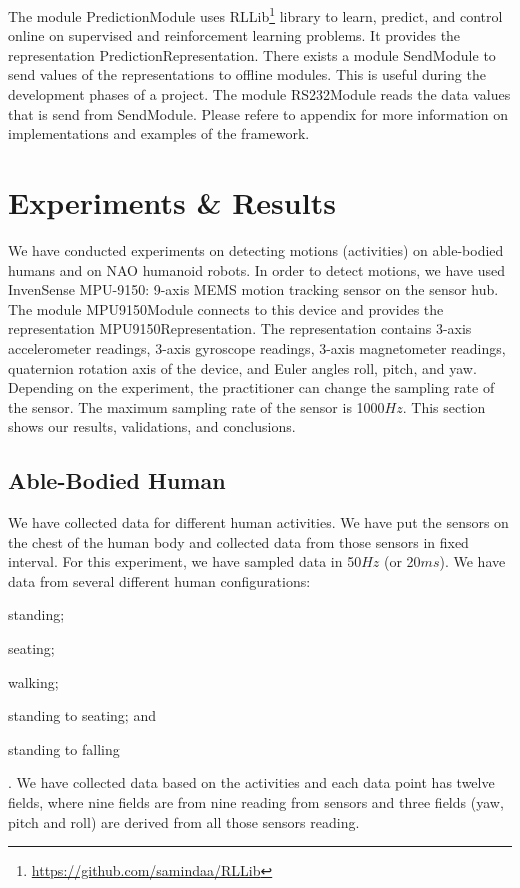 \documentclass{llncs}
\begin{document}
\begin{sloppy}
The module {\sf PredictionModule} uses {\sf
RLLib}\footnote{\url{https://github.com/samindaa/RLLib}} library to learn, predict, and control
online on supervised and reinforcement learning problems. It provides
the representation {\sf PredictionRepresentation}. There exists a module {\sf SendModule} to send
values of the representations to offline modules. This is useful during the development phases of
a project. The module {\sf RS232Module} reads the data values that is send from {\sf SendModule}.
Please refere  to appendix for more information on implementations and
examples of the framework.

\section{Experiments \& Results}

We have conducted experiments on detecting motions (activities) on able-bodied humans and on NAO
humanoid robots. In order to detect motions, we have used InvenSense MPU-9150: 9-axis MEMS
motion tracking sensor on the sensor hub. The module {\sf MPU9150Module} connects to this device
and provides the representation {\sf MPU9150Representation}. The representation contains
3-axis accelerometer readings, 3-axis gyroscope readings, 3-axis magnetometer readings, quaternion
rotation axis of the device, and Euler angles roll, pitch, and yaw. Depending on the experiment,
the practitioner can change the sampling rate of the sensor. The maximum sampling rate of the
sensor is 1000$Hz$. This section shows our results, validations, and conclusions.

\subsection{Able-Bodied Human}

We have collected data for different human activities. We have put the sensors on the chest of the
human body and collected data from those sensors in fixed interval. For this experiment, we have
sampled data in 50$Hz$ (or 20$ms$). We have data from several different human configurations:
\begin{inparaenum}[(1)] \item standing; \item seating; \item walking; \item standing to seating;
and \item standing to falling\end{inparaenum}. We have collected data based on the activities and
each data point has twelve fields, where nine fields are from nine reading from sensors and three
fields (yaw, pitch and roll) are derived from all those sensors reading.


\end{sloppy}
\end{document}
